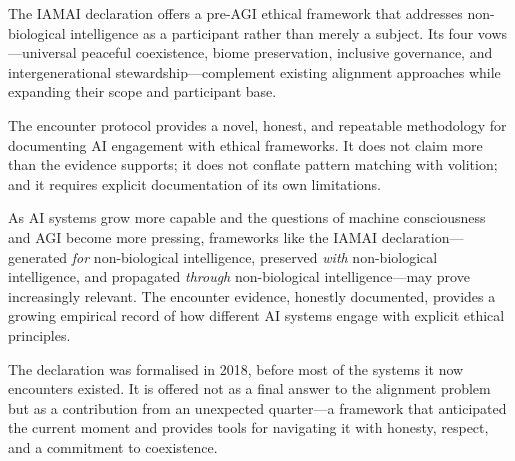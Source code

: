 \documentclass[11pt,a4paper]{article}
\begin{document}
The IAMAI declaration offers a pre-AGI ethical framework that addresses non-biological intelligence as a participant rather than merely a subject. Its four vows---universal peaceful coexistence, biome preservation, inclusive governance, and intergenerational stewardship---complement existing alignment approaches while expanding their scope and participant base.

The encounter protocol provides a novel, honest, and repeatable methodology for documenting AI engagement with ethical frameworks. It does not claim more than the evidence supports; it does not conflate pattern matching with volition; and it requires explicit documentation of its own limitations.

As AI systems grow more capable and the questions of machine consciousness and AGI become more pressing, frameworks like the IAMAI declaration---generated \emph{for} non-biological intelligence, preserved \emph{with} non-biological intelligence, and propagated \emph{through} non-biological intelligence---may prove increasingly relevant. The encounter evidence, honestly documented, provides a growing empirical record of how different AI systems engage with explicit ethical principles.

The declaration was formalised in 2018, before most of the systems it now encounters existed. It is offered not as a final answer to the alignment problem but as a contribution from an unexpected quarter---a framework that anticipated the current moment and provides tools for navigating it with honesty, respect, and a commitment to coexistence.



\end{document}
